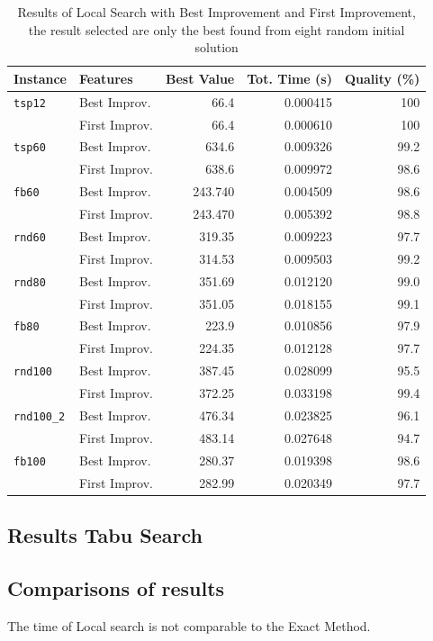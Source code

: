 	\begin{table}
		\centering
		\begin{tabular}{llrrr}
			\toprule
			\textbf{Instance} & \textbf{Features} & \textbf{Best Value} & \textbf{Tot. Time (s)} & \textbf{Quality (\%)} \\
			\midrule
			\verb|tsp12| & Best Improv. & 66.4 & 0.000415 & 100 \\
							& First Improv. & 66.4 & 0.000610 & 100 \\
			\midrule
			\verb|tsp60| 	& Best Improv. & 634.6 & 0.009326 & 99.2 \\
							& First Improv. & 638.6 & 0.009972 & 98.6 \\
			\midrule
			\verb|fb60|		& Best Improv. & 243.740 & 0.004509 & 98.6 \\
							& First Improv. & 243.470 & 0.005392 & 98.8 \\ 
			\midrule
			\verb|rnd60| 	& Best Improv. & 319.35 & 0.009223 & 97.7 \\
							& First Improv. & 314.53 & 0.009503 & 99.2 \\
			\midrule
			\verb|rnd80| 	& Best Improv. & 351.69 & 0.012120 & 99.0 \\
							& First Improv. & 351.05 & 0.018155 & 99.1 \\
			\midrule
			\verb|fb80| 	& Best Improv. & 223.9 & 0.010856 & 97.9 \\
							& First Improv. & 224.35 & 0.012128 & 97.7 \\
			\midrule
			\verb|rnd100| 	& Best Improv. & 387.45 & 0.028099 & 95.5 \\
							& First Improv. & 372.25 & 0.033198 & 99.4 \\
			\midrule
			\verb|rnd100_2| & Best Improv. & 476.34 & 0.023825 & 96.1 \\
							& First Improv. & 483.14 & 0.027648 & 94.7 \\
			\midrule
			\verb|fb100| & Best Improv. & 280.37 & 0.019398 & 98.6 \\
						& First Improv. & 282.99 & 0.020349 & 97.7 \\
			\bottomrule
		\end{tabular}
		\caption{\label{tab:LS-BestStrategyResult} Results of Local Search with Best Improvement and First Improvement, the result selected are only the best found from eight random initial solution}
	\end{table}
	
\newpage
\subsection{Results Tabu Search}


\subsection{Comparisons of results}

	The time of Local search is not comparable to the Exact Method.